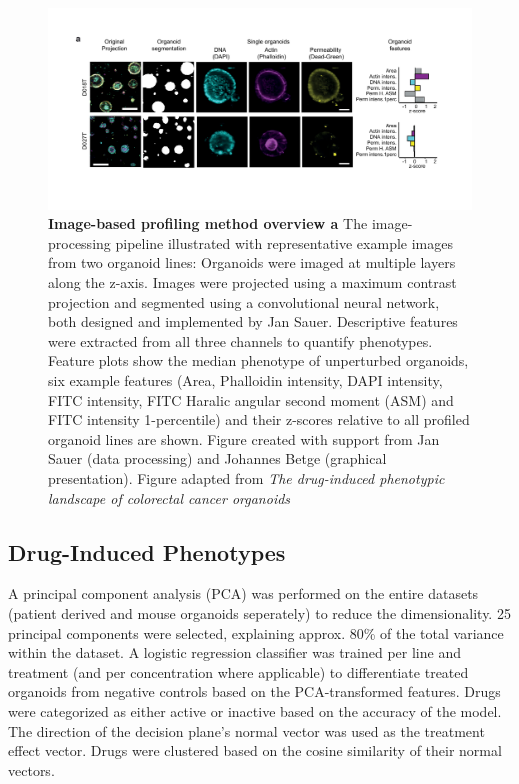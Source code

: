 \begin{flushleft}
\begin{figure}[h]
\centering
\includegraphics[width=\textwidth,
                height=\textheight,
                keepaspectratio]{figures/promise/pdf/fig_1_2.pdf}
\caption[Image-based profiling method overview]{\textbf{Image-based profiling method overview a} The image-processing pipeline illustrated with representative example images from two organoid lines: Organoids were imaged at multiple layers along the z-axis. Images were projected using a maximum contrast projection and segmented using a convolutional neural network, both designed and implemented by Jan Sauer. Descriptive features were extracted from all three channels to quantify phenotypes. Feature plots show the median phenotype of unperturbed organoids, six example features (Area, Phalloidin intensity, DAPI intensity, FITC intensity, FITC Haralic angular second moment (ASM) and FITC intensity 1-percentile) and their z-scores relative to all profiled organoid lines are shown. Figure created with support from Jan Sauer (data processing) and Johannes Betge (graphical presentation). Figure adapted from \textit{The drug-induced phenotypic landscape of colorectal cancer organoids} \citep{betgeDruginducedPhenotypicLandscape2022}}
\label{fig_135}
\end{figure}

\subsection{Drug-Induced Phenotypes}
A principal component analysis (PCA) was performed on the entire datasets (patient derived and mouse organoids seperately) to reduce the dimensionality. 25 principal components were selected, explaining approx. 80\% of the total variance within the dataset. A logistic regression classifier was trained per line and treatment (and per concentration where applicable) to differentiate treated organoids from negative controls based on the PCA-transformed features. Drugs were categorized as either active or inactive based on the accuracy of the model. The direction of the decision plane's normal vector was used as the treatment effect vector. Drugs were clustered based on the cosine similarity of their normal vectors.



\end{flushleft}
